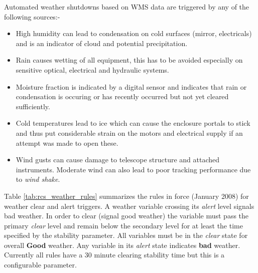 Automated weather shutdowns based on WMS data are triggered by any of the following sources:-
\begin{itemize}
\item High humidity can lead to condensation on cold surfaces (mirror, electricals) and is an indicator of cloud and potential precipitation.
\item Rain causes wetting of all equipment, this has to be avoided especially on sensitive optical, electrical and hydraulic systems.
\item Moisture fraction is indicated by a digital sensor and indicates that rain or condensation is occuring or has recently occurred but not yet cleared sufficiently.
\item Cold temperatures lead to ice which can cause the enclosure portals to stick and thus put considerable strain on the motors and electrical supply if an attempt was made to open these.
\item Wind gusts  can cause damage to telescope structure and attached instruments. Moderate wind can also lead to poor tracking performance due to \emph{wind shake}.
\end{itemize}

Table \ref{tab:rcs_weather_rules} summarizes the rules in force (January 2008) for weather clear and alert triggers. A weather variable crossing its \emph{alert} level signals bad weather. In order to clear (signal good weather) the variable must pass the primary \emph{clear} level and remain below the secondary level for at least the time specified by the stability parameter. All variables must be in the \emph{clear} state for overall {\bf Good} weather. Any variable in its \emph{alert} state indicates {\bf bad} weather. Currently all rules have a 30 minute clearing stability time but this is a configurable parameter.


